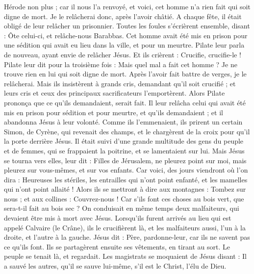 \begin{multicols}{2}
Hérode non plus ; car il nous l'a renvoyé, et voici, cet homme n'a rien fait qui soit digne de mort.
Je le relâcherai donc, après l'avoir châtié.
A chaque fête, il était obligé de leur relâcher un prisonnier.
Toutes les foules s'écrièrent ensemble, disant : Ôte celui-ci, et relâche-nous Barabbas.
Cet homme avait été mis en prison pour une sédition qui avait eu lieu dans la ville, et pour un meurtre.
Pilate leur parla de nouveau, ayant envie de relâcher Jésus.
Et ils crièrent : Crucifie, crucifie-le !
Pilate leur dit pour la troisième fois : Mais quel mal a fait cet homme ? Je ne trouve rien en lui qui soit digne de mort. Après l'avoir fait battre de verges, je le relâcherai.
Mais ils insistèrent à grands cris, demandant qu'il soit crucifié ; et leurs cris et ceux des principaux sacrificateurs l'emportèrent.
Alors Pilate prononça que ce qu'ils demandaient, serait fait.
Il leur relâcha celui qui avait été mis en prison pour sédition et pour meurtre, et qu'ils demandaient ; et il abandonna Jésus à leur volonté.
Comme ils l'emmenaient, ils prirent un certain Simon, de Cyrène, qui revenait des champs, et le chargèrent de la croix pour qu'il la porte derrière Jésus.
Il était suivi d'une grande multitude des gens du peuple et de femmes, qui se frappaient la poitrine, et se lamentaient sur lui.
Mais Jésus se tourna vers elles, leur dit : Filles de Jérusalem, ne pleurez point sur moi, mais pleurez sur vous-mêmes, et sur vos enfants.
Car voici, des jours viendront où l'on dira : Heureuses les stériles, les entrailles qui n'ont point enfanté, et les mamelles qui n'ont point allaité !
Alors ils se mettront à dire aux montagnes : Tombez sur nous ; et aux collines : Couvrez-nous !
Car s'ils font ces choses au bois vert, que sera-t-il fait au bois sec ?
On conduisait en même temps deux malfaiteurs, qui devaient être mis à mort avec Jésus.
Lorsqu'ils furent arrivés au lieu qui est appelé Calvaire (le Crâne), ils le crucifièrent là, et les malfaiteurs aussi, l'un à la droite, et l'autre à la gauche.
Jésus dit : Père, pardonne-leur, car ils ne savent pas ce qu'ils font. Ils se partagèrent ensuite ses vêtements, en tirant au sort.
Le peuple se tenait là, et regardait. Les magistrats se moquaient de Jésus disant : Il a sauvé les autres, qu'il se sauve lui-même, s'il est le Christ, l'élu de Dieu.

\end{multicols}
